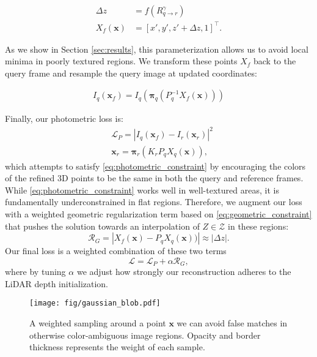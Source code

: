 \begin{align}\label{eq:mlp_forward}
\Delta z &= f(R^\gamma_{q \rightarrow r}) \\ \nonumber
X_f(\bm{x}) &= \left[x',y',z' + \Delta z,1\right]^\top. \nonumber
\end{align}

\noindent As we show in Section \ref{sec:results}, this parameterization allows us to avoid local minima in poorly textured regions. We transform these points $X_f$ back to the query frame and resample the query image at updated coordinates:

\begin{align}\label{eq:resample}
I_q(\bm{x}_f) = I_q(\bm{\pi}_q(P_q^{-1}X_f(\bm{x})))
\end{align}


\noindent Finally, our photometric loss is:
\begin{align}\label{eq:photometric_loss}
    &\mathcal{L}_P = |I_q(\bm{x}_f) - I_r(\bm{x}_r)|^2  \nonumber\\
    &\bm{x}_r = \bm{\pi}_r(K_r P_q X_q(\bm{x})),
\end{align}
which attempts to satisfy \eqref{eq:photometric_constraint} by encouraging the colors of the refined 3D points to be the same in both the query and reference frames. While \eqref{eq:photometric_constraint} works well in well-textured areas, it is fundamentally underconstrained in flat regions. Therefore, we augment our loss with a weighted geometric regularization term based on \eqref{eq:geometric_constraint} that pushes the solution towards an interpolation of $Z\in\mathcal{Z}$ in these regions:
\begin{equation}\label{eq:geometric_loss}
    \mathcal{R}_G = |X_f(\bm{x}) - P_q X_q(\bm{x}))| \approx |\Delta z|.
\end{equation}
Our final loss is a weighted combination of these two terms
\begin{equation}\label{eq:loss}
    \mathcal{L} = \mathcal{L}_P + \alpha\mathcal{R}_G,
\end{equation}
where by tuning $\alpha$ we adjust how strongly our reconstruction adheres to the LiDAR depth initialization.
\begin{figure}[t!]
    \centering
    \texttt{[image: fig/gaussian\_blob.pdf]}
    \caption{A weighted sampling around a point $\bm{x}$ we can avoid false matches in otherwise color-ambiguous image regions. Opacity and border thickness represents the weight of each sample.}
    \label{fig:gaussian-blob}
    \vspace{-1em}
\end{figure}

